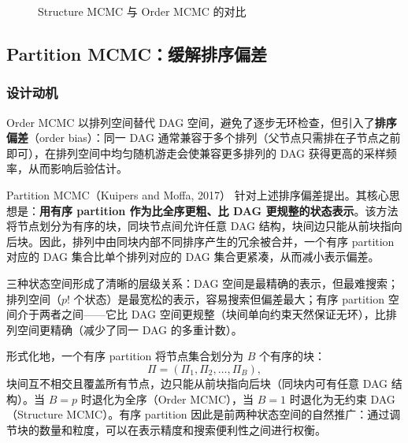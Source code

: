 \documentclass[UTF8,a4paper,12pt]{ctexart}
\begin{document}
\begin{figure}[htbp]
\centering
{}
\caption{Structure MCMC 与 Order MCMC 的对比}
\label{fig:order_mechanism}
\end{figure}

\subsection{Partition MCMC：缓解排序偏差}

\subsubsection{设计动机}

Order MCMC 以排列空间替代 DAG 空间，避免了逐步无环检查，但引入了\textbf{排序偏差}（order bias）：同一 DAG 通常兼容于多个排列（父节点只需排在子节点之前即可），在排列空间中均匀随机游走会使兼容更多排列的 DAG 获得更高的采样频率，从而影响后验估计。

Partition MCMC（Kuipers and Moffa, 2017）\citep{kuipers2017partition} 针对上述排序偏差提出。其核心思想是：\textbf{用有序 partition 作为比全序更粗、比 DAG 更规整的状态表示}。该方法将节点划分为有序的块，同块节点间允许任意 DAG 结构，块间边只能从前块指向后块。因此，排列中由同块内部不同排序产生的冗余被合并，一个有序 partition 对应的 DAG 集合比单个排列对应的 DAG 集合更紧凑，从而减小表示偏差。

三种状态空间形成了清晰的层级关系：DAG 空间是最精确的表示，但最难搜索；排列空间（$p!$ 个状态）是最宽松的表示，容易搜索但偏差最大；有序 partition 空间介于两者之间——它比 DAG 空间更规整（块间单向约束天然保证无环），比排列空间更精确（减少了同一 DAG 的多重计数）。

形式化地，一个有序 partition 将节点集合划分为 $B$ 个有序的块：
\begin{equation}
\Pi = (\Pi_1, \Pi_2, \ldots, \Pi_B),
\end{equation}
块间互不相交且覆盖所有节点，边只能从前块指向后块（同块内可有任意 DAG 结构）。当 $B = p$ 时退化为全序（Order MCMC），当 $B = 1$ 时退化为无约束 DAG（Structure MCMC）。有序 partition 因此是前两种状态空间的自然推广：通过调节块的数量和粒度，可以在表示精度和搜索便利性之间进行权衡。
\end{document}
